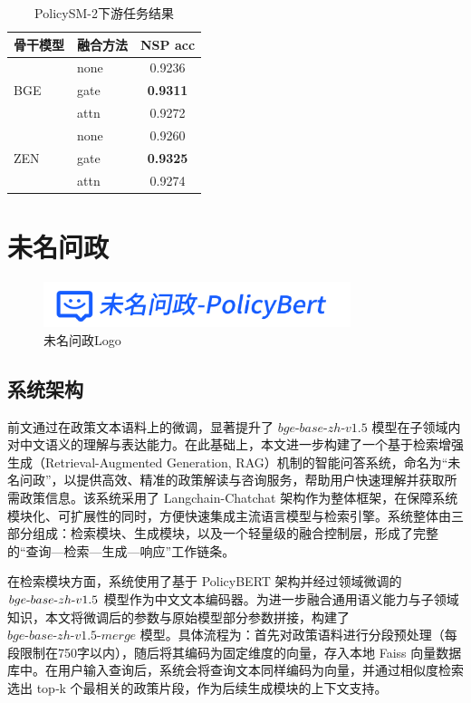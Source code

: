 \documentclass[12pt, a4paper]{ctexart}
\begin{document}
  \begin{table}[htbp]
    \centering
    \begin{tabular}{llc}
      \toprule
      骨干模型 & 融合方法 & NSP acc \\
      \midrule
      \multirow{3}{*}{BGE}
        & none & 0.9236 \\
        & gate & \textbf{0.9311} \\
        & attn & 0.9272 \\
      \midrule
      \multirow{3}{*}{ZEN}
        & none & 0.9260 \\
        & gate & \textbf{0.9325} \\
        & attn & 0.9274 \\
      \bottomrule
    \end{tabular}
    \caption{PolicySM-2下游任务结果}
    \label{tab:nsp-results}
  \end{table}

\newpage
\section{未名问政}
\begin{figure}[H]
    \centering
    \includegraphics[width=0.8\textwidth]{./images/WeiMingPolicyLogo.png}
    \caption{未名问政Logo}
    \label{fig:WeiMingLogo}
\end{figure}
\subsection{系统架构}
前文通过在政策文本语料上的微调，显著提升了 $bge\text{-}base\text{-}zh\text{-}v1.5$ 模型在子领域内对中文语义的理解与表达能力。在此基础上，本文进一步构建了一个基于检索增强生成（Retrieval-Augmented Generation, RAG）机制的智能问答系统，命名为“未名问政”，以提供高效、精准的政策解读与咨询服务，帮助用户快速理解并获取所需政策信息。该系统采用了 Langchain-Chatchat 架构作为整体框架，在保障系统模块化、可扩展性的同时，方便快速集成主流语言模型与检索引擎。系统整体由三部分组成：检索模块、生成模块，以及一个轻量级的融合控制层，形成了完整的“查询—检索—生成—响应”工作链条。

在检索模块方面，系统使用了基于 PolicyBERT 架构并经过领域微调的 $bge\text{-}base\text{-}\\zh\text{-}v1.5$ 模型作为中文文本编码器。为进一步融合通用语义能力与子领域知识，本文将微调后的参数与原始模型部分参数拼接，构建了 $bge\text{-}base\text{-}zh\text{-}v1.5\text{-}merge$ 模型。具体流程为：首先对政策语料进行分段预处理（每段限制在750字以内），随后将其编码为固定维度的向量，存入本地 Faiss 向量数据库中。在用户输入查询后，系统会将查询文本同样编码为向量，并通过相似度检索选出 top‑k 个最相关的政策片段，作为后续生成模块的上下文支持。
\end{document}
